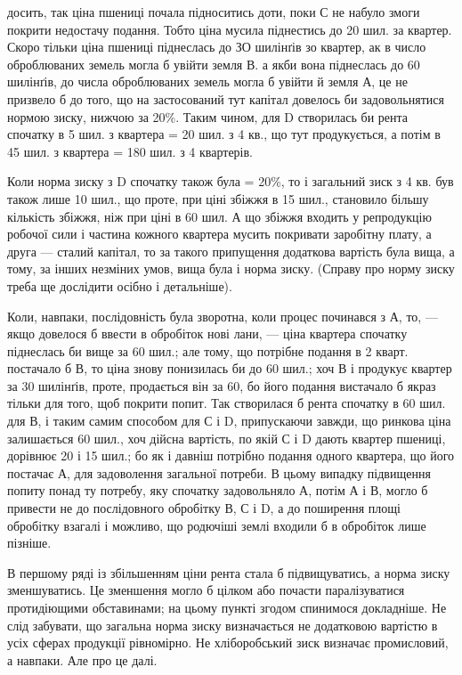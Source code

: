 \parcont{}  %
досить, так ціна пшениці почала підноситись доти, поки С не набуло змоги
покрити недостачу подання. Тобто ціна мусила піднестись до 20 шил. за
квартер. Скоро тільки ціна пшениці піднеслась до ЗО шилінґів зо квартер, ак
в число оброблюваних земель могла б увійти земля В. а якби вона піднеслась
до 60 шилінґів, до числа оброблюваних земель могла б увійти й земля А, це
не призвело б до того, що на застосований тут капітал довелось би задовольнятися
нормою зиску, нижчою за 20\%. Таким чином, для D створилась би
рента спочатку в 5 шил. з квартера = 20 шил. з 4 кв., що тут продукується,
а потім в 45 шил. з квартера = 180 шил. з 4 квартерів.

Коли норма зиску з D спочатку також була = 20\%, то і загальний зиск
з 4 кв. був також лише 10 шил., що проте, при ціні збіжжя в 15 шил., становило
більшу кількість збіжжя, ніж при ціні в 60 шил. А що збіжжя входить
у репродукцію робочої сили і частина кожного квартера мусить покривати заробітну
плату, а друга — сталий капітал, то за такого припущення додаткова
вартість була вища, а тому, за інших незміних умов, вища була і норма зиску.
(Справу про норму зиску треба ще дослідити осібно і детальніше).

Коли, навпаки, послідовність була зворотна, коли процес починався з А,
то, — якщо довелося б ввести в обробіток нові лани, — ціна квартера спочатку
піднеслась би вище за 60 шил.; але тому, що потрібне подання в 2 кварт. постачало
б В, то ціна знову понизилась би до 60 шил.; хоч В і продукує квартер
за 30 шилінґів, проте, продається він за 60, бо його подання вистачало б
якраз тільки для того, щоб покрити попит. Так створилася б рента спочатку в
60 шил. для В, і таким самим способом для С і D, припускаючи завжди, що
ринкова ціна залишається 60 шил., хоч дійсна вартість, по якій С і D дають
квартер пшениці, дорівнює 20 і 15 шил.; бо як і давніш потрібно подання одного
квартера, що його постачає А, для задоволення загальної потреби. В цьому випадку
підвищення попиту понад ту потребу, яку спочатку задовольняло А, потім
А і В, могло б привести не до послідовного обробітку В, С і D, а до поширення
площі обробітку взагалі і можливо, що родючіші землі входили б в обробіток
лише пізніше.

В першому ряді із збільшенням ціни рента стала б підвищуватись, а норма
зиску зменшуватись. Це зменшення могло б цілком або почасти паралізуватися
протидіющими обставинами; на цьому пункті згодом спинимося докладніше.
Не слід забувати, що загальна норма зиску визначається не додатковою вартістю
в усіх сферах продукції рівномірно. Не хліборобський зиск визначає промисловий,
а навпаки. Але про це далі.

